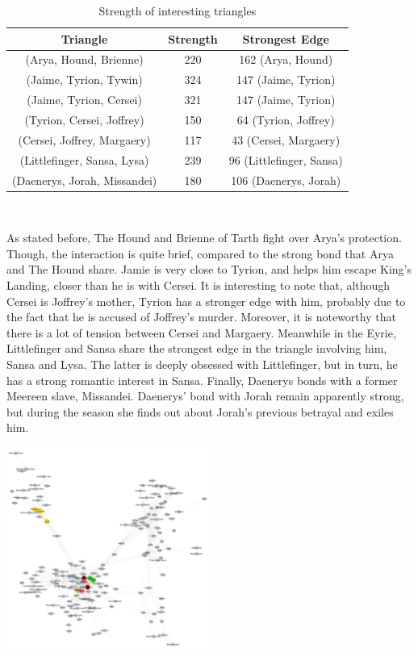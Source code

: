 \documentclass[10pt,twocolumn,letterpaper]{article}
\begin{document}
\begin{table}[h!]
    \centering
    \small
    \begin{tabular}{c|c|c}
        Triangle & Strength & Strongest Edge  \\
        \hline
        (Arya, Hound, Brienne) & 220 & 162 (Arya, Hound) \\
        (Jaime, Tyrion, Tywin) & 324 & 147 (Jaime, Tyrion) \\
        (Jaime, Tyrion, Cersei) & 321 & 147 (Jaime, Tyrion) \\
        (Tyrion, Cersei, Joffrey) & 150 & 64 (Tyrion, Joffrey) \\
        (Cersei, Joffrey, Margaery) & 117 & 43 (Cersei, Margaery) \\
        (Littlefinger, Sansa, Lysa) & 239 & 96 (Littlefinger, Sansa) \\
        (Daenerys, Jorah, Missandei) & 180 & 106 (Daenerys, Jorah) \\
        \hline 
    \end{tabular} \\
    \vspace{0.2cm}
    \caption{Strength of interesting triangles}
    \label{tab:my_label}
\end{table}

As stated before, The Hound and Brienne of Tarth fight over Arya's protection. Though, the interaction is quite brief, compared to the strong bond that Arya and The Hound share. Jamie is very close to Tyrion, and helps him escape King's Landing, closer than he is with Cersei. It is interesting to note that, although Cersei is Joffrey's mother, Tyrion has a stronger edge with him, probably due to the fact that he is accused of Joffrey's murder. Moreover, it is noteworthy that there is a lot of tension between Cersei and Margaery. 
Meanwhile in the Eyrie, Littlefinger and Sansa share the strongest edge in the triangle involving him, Sansa and Lysa. The latter is deeply obsessed with Littlefinger, but in turn, he has a strong romantic interest in Sansa. Finally, Daenerys bonds with a former Meereen slave, Missandei. Daenerys' bond with Jorah remain apparently strong, but during the season she finds out about Jorah's previous betrayal and exiles him. 


\begin{center}
    \includegraphics[width=0.5\textwidth]{img/s4/s4_triangles.jpg}
\end{center}
\end{document}
